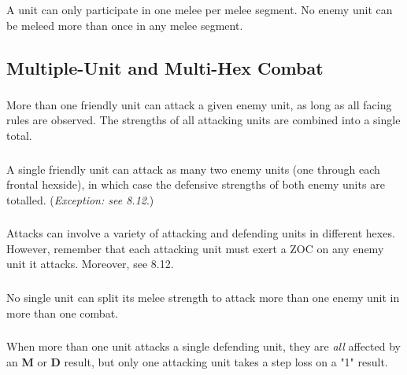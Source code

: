 \subsubsection[Only One Melee]{} A unit can only participate in one melee per melee segment. No enemy unit can be meleed more than once in any melee segment.

\subsection{Multiple-Unit and Multi-Hex Combat}

\subsubsection[Multiple Units]{} More than one friendly unit can attack a given enemy unit, as long as all facing rules are observed. The strengths of all attacking units are combined into a single total.

\subsubsection[One Unit Versus Many]{} A single friendly unit can attack as many two enemy units (one through each frontal hexside), in which case the defensive strengths of both enemy units are totalled. (\textit{Exception: see 8.12}.)

\subsubsection[Attacks and ZOCs]{} Attacks can involve a variety of attacking and defending units in different hexes. However, remember that each attacking unit must exert a ZOC on any enemy unit it attacks. Moreover, see 8.12.

\subsubsection[No Split Strength]{} No single unit can split its melee strength to attack more than one enemy unit in more than one combat.

\subsubsection[Different Results]{} When more than one unit attacks a single defending unit, they are \textit{all} affected by an \textbf{M} or \textbf{D} result, but only one attacking unit takes a step loss on a "1" result.

